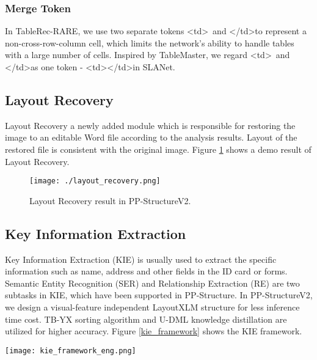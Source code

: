 \documentclass[letterpaper]{article} \usepackage{aaai21}  \usepackage{times}  \usepackage{helvet} \usepackage{courier}  \usepackage[hyphens]{url}  \usepackage{graphicx} \usepackage{algorithm}
\begin{document}
\subsubsection{Merge Token}

In TableRec-RARE, we use two separate tokens \textless td\textgreater \ and \textless/td\textgreater to represent a non-cross-row-column cell, which limits the network's ability to handle tables with a large number of cells. Inspired by TableMaster\cite{TableMaster}, we regard \textless td\textgreater \ and \textless/td\textgreater as one token - \textless td\textgreater\textless/td\textgreater in SLANet.


\subsection{Layout Recovery}

Layout Recovery a newly added module which is responsible for restoring the image to an editable Word file according to the analysis results. Layout of the restored file is consistent with the original image. Figure \ref{pic:layout_recovery} shows a demo result of Layout Recovery.

\begin{figure}[H]
\centering
\centering
\texttt{[image: ./layout\_recovery.png]}
\caption{Layout Recovery result in PP-StructureV2.}
\label{pic:layout_recovery}
\end{figure}

\subsection{Key Information Extraction}

Key Information Extraction (KIE) is usually used to extract the specific information such as name, address and other fields in the ID card or forms. Semantic Entity Recognition (SER) and Relationship Extraction (RE) are two subtasks in KIE, which have been supported in PP-Structure. In PP-StructureV2, we design a visual-feature independent LayoutXLM structure for less inference time cost. TB-YX sorting algorithm and U-DML knowledge distillation are utilized for higher accuracy. Figure \ref{kie_framework} shows the KIE framework.

\begin{figure*}[h]
\centering
\texttt{[image: kie\_framework\_eng.png]}
\caption{Key Information Extraction framework in PP-StructureV2.}
\label{kie_framework}
\end{figure*}
\end{document}
